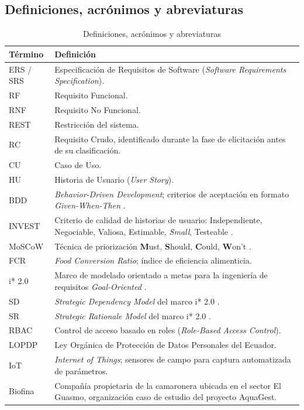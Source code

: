 \documentclass[12pt,a4paper]{article}
\begin{document}
\subsection{Definiciones, acrónimos y abreviaturas}

\begin{longtable}{|p{3.2cm}|p{11cm}|}
\caption{Definiciones, acrónimos y abreviaturas} \\
\hline
\textbf{Término} & \textbf{Definición} \\
\hline
\endfirsthead
\endhead
ERS / SRS & Especificación de Requisitos de Software (\textit{Software Requirements Specification}). \\ \hline
RF & Requisito Funcional. \\ \hline
RNF & Requisito No Funcional. \\ \hline
REST & Restricción del sistema. \\ \hline
RC & Requisito Crudo, identificado durante la fase de elicitación antes de su clasificación. \\ \hline
CU & Caso de Uso. \\ \hline
HU & Historia de Usuario (\textit{User Story}). \\ \hline
BDD & \textit{Behavior-Driven Development}; criterios de aceptación en formato \textit{Given-When-Then} \cite{Cohn2004}. \\ \hline
INVEST & Criterio de calidad de historias de usuario: Independiente, Negociable, Valiosa, Estimable, \textit{Small}, Testeable \cite{Cohn2004}. \\ \hline
MoSCoW & Técnica de priorización \textbf{M}ust, \textbf{S}hould, \textbf{C}ould, \textbf{W}on't \cite{Kravchenko2022}. \\ \hline
FCR & \textit{Food Conversion Ratio}; índice de eficiencia alimenticia. \\ \hline
i* 2.0 & Marco de modelado orientado a metas para la ingeniería de requisitos \textit{Goal-Oriented} \cite{Yu1995,Kavakli2002}. \\ \hline
SD & \textit{Strategic Dependency Model} del marco i* 2.0 \cite{Yu1995}. \\ \hline
SR & \textit{Strategic Rationale Model} del marco i* 2.0 \cite{Yu1995}. \\ \hline
RBAC & Control de acceso basado en roles (\textit{Role-Based Access Control}). \\ \hline
LOPDP & Ley Orgánica de Protección de Datos Personales del Ecuador. \\ \hline
IoT & \textit{Internet of Things}; sensores de campo para captura automatizada de parámetros. \\ \hline
Biofina & Compañía propietaria de la camaronera ubicada en el sector El Guasmo, organización caso de estudio del proyecto AquaGest. \\ \hline
\end{longtable}
\end{document}

